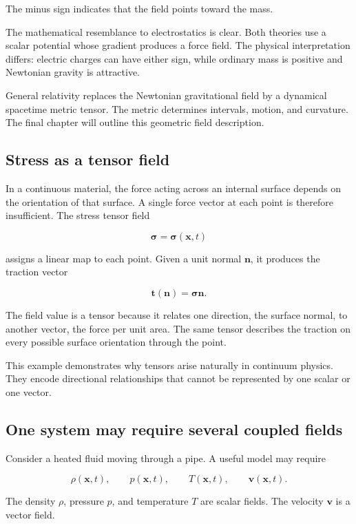 The minus sign indicates that the field points toward the mass.

The mathematical resemblance to electrostatics is clear. Both theories use a scalar potential whose gradient produces a force field. The physical interpretation differs: electric charges can have either sign, while ordinary mass is positive and Newtonian gravity is attractive.

General relativity replaces the Newtonian gravitational field by a dynamical spacetime metric tensor. The metric determines intervals, motion, and curvature. The final chapter will outline this geometric field description.

\subsection{Stress as a tensor field}

In a continuous material, the force acting across an internal surface depends on the orientation of that surface. A single force vector at each point is therefore insufficient. The stress tensor field

\[
\boldsymbol{\sigma}=\boldsymbol{\sigma}(\mathbf{x},t)
\]

assigns a linear map to each point. Given a unit normal \(\mathbf{n}\), it produces the traction vector

\[
\mathbf{t}(\mathbf{n})
=
\boldsymbol{\sigma}\mathbf{n}.
\]

The field value is a tensor because it relates one direction, the surface normal, to another vector, the force per unit area. The same tensor describes the traction on every possible surface orientation through the point.

This example demonstrates why tensors arise naturally in continuum physics. They encode directional relationships that cannot be represented by one scalar or one vector.

\subsection{One system may require several coupled fields}

Consider a heated fluid moving through a pipe. A useful model may require

\[
\rho(\mathbf{x},t),
\qquad
p(\mathbf{x},t),
\qquad
T(\mathbf{x},t),
\qquad
\mathbf{v}(\mathbf{x},t).
\]

The density \(\rho\), pressure \(p\), and temperature \(T\) are scalar fields. The velocity \(\mathbf{v}\) is a vector field.

